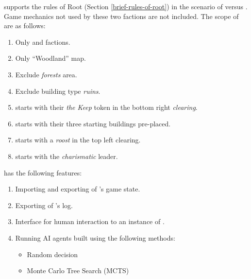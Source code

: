 \RootOurs{} supports the rules of Root (Section \ref{brief-rules-of-root}) in the scenario of \Marquise{} versus \Eyrie{}. Game mechanics not used by these two factions are not included. The scope of \RootOurs{} are as follows:
\begin{enumerate}
    \item Only \Marquise{} and \Eyrie{} factions.
    \item Only ``Woodland'' map.
    \item Exclude \textit{forests} area.
    \item Exclude building type \textit{ruins}.
    \item \Marquise{} starts with their \textit{the Keep} token in the bottom right \textit{clearing}.
    \item \Marquise{} starts with their three starting buildings pre-placed.
    \item \Eyrie{} starts with a \textit{roost} in the top left clearing.
    \item \Eyrie{} starts with the \textit{charismatic} leader.
\end{enumerate}

\RootAI{} has the following features:
\begin{enumerate}
    \item Importing and exporting of \RootOurs{}'s game state.
    \item Exporting of \RootOurs{}'s log.
    \item Interface for human interaction to an instance of \RootOurs{}.
    \item Running AI agents built using the following methods:
    \begin{itemize}
        \item Random decision
        \item Monte Carlo Tree Search (MCTS)
    \end{itemize}
\end{enumerate}



